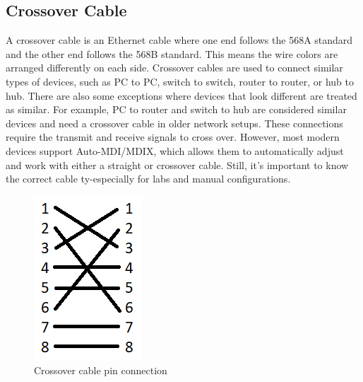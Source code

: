 \documentclass[a4paper]{article}
\begin{document}
\subsection{Crossover Cable}
A crossover cable is an Ethernet cable where one end follows the 568A standard and the other end follows the 568B standard. This means the wire colors are arranged differently on each side. Crossover cables are used to connect similar types of devices, such as PC to PC, switch to switch, router to router, or hub to hub. There are also some exceptions where devices that look different are treated as similar. For example, PC to router and switch to hub are considered similar devices and need a crossover cable in older network setups. These connections require the transmit and receive signals to cross over. However, most modern devices support Auto-MDI/MDIX, which allows them to automatically adjust and work with either a straight or crossover cable. Still, it's important to know the correct cable ty-especially for labs and manual configurations.
\begin{figure}[h]
    \centering
    \includegraphics[width=0.3\linewidth]{crossover_cable.png}
    \caption{Crossover cable pin connection}
\end{figure}
\end{document}
